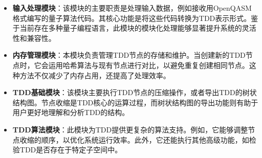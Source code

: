 \begin{itemize}
    \item \textbf{输入处理模块}：该模块的主要职责是处理输入数据，例如接收用OpenQASM格式编写的量子算法代码。其核心功能是将这些代码转换为TDD表示形式。鉴于当前存在多种量子编程语言，此模块的模块化处理能够显著提升系统的灵活性和兼容性。
    \item \textbf{内存管理模块}：本模块负责管理TDD节点的存储和维护。当创建新的TDD节点时，它会运用哈希算法与现有节点进行对比，以避免重复创建相同节点。这种方法不仅减少了内存占用，还提高了处理效率。
    \item \textbf{TDD基础模块}：该模块主要执行TDD节点的压缩操作，或者导出TDD的树状结构图。节点收缩是TDD核心的运算过程，而树状结构图的导出功能则有助于用户更好地理解和分析TDD的结构。
    \item \textbf{TDD算法模块}：此模块为TDD提供更复杂的算法支持。例如，它能够调整节点收缩的顺序，以优化系统运行效率。此外，它还能执行其他高级功能，如检验TDD是否存在于特定子空间中。
\end{itemize}
